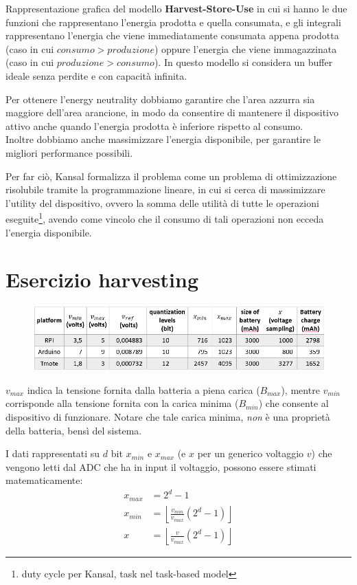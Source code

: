 Rappresentazione grafica del modello \textbf{Harvest-Store-Use} in cui si hanno le due funzioni che rappresentano l'energia prodotta e quella consumata, e gli integrali rappresentano l'energia che viene immediatamente consumata appena prodotta (caso in cui $consumo > produzione$) oppure l'energia che viene immagazzinata (caso in cui $produzione > consumo$). In questo modello si considera un buffer ideale senza perdite e con capacità infinita.

Per ottenere l'energy neutrality dobbiamo garantire che l'area azzurra sia maggiore dell'area arancione, in modo da consentire di mantenere il dispositivo attivo anche quando l'energia prodotta è inferiore rispetto al consumo.\\
Inoltre dobbiamo anche massimizzare l'energia disponibile, per garantire le migliori performance possibili.

Per far ciò, Kansal formalizza il problema come un problema di ottimizzazione risolubile tramite la programmazione lineare, in cui si cerca di massimizzare l'utility del dispositivo, ovvero la somma delle utilità di tutte le operazioni eseguite\footnote{duty cycle per Kansal, task nel task-based model}, avendo come vincolo che il consumo di tali operazioni non ecceda l'energia disponibile.

\section{Esercizio harvesting}

\begin{figure}[htbp]
   \centering
   \includegraphics{images/questions/Schermata del 2023-10-20 11-56-49.png}
   \label{fig:dom26}
\end{figure}

$v_{max}$ indica la tensione fornita dalla batteria a piena carica ($B_{max}$), mentre $v_{min}$ corrisponde alla tensione fornita con la carica minima ($B_{min}$) che consente al dispositivo di funzionare.
Notare che tale carica minima, \textit{non} è una proprietà della batteria, bensì del sistema.

I dati rappresentati su $d$ bit $x_{min}$ e $x_{max}$ (e $x$ per un generico voltaggio $v$) che vengono letti dal ADC che ha in input il voltaggio, possono essere stimati matematicamente:
\begin{align}
    x_{max} &= 2^d -1\\
    x_{min} &= \left\lfloor\frac{v_{min}}{v_{max}}(2^d - 1)\right\rfloor\\
    x &= \left\lfloor\frac{v}{v_{max}}(2^d - 1)\right\rfloor
\end{align}

